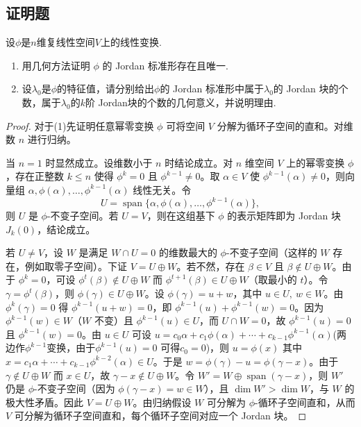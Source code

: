 \documentclass[lang=cn,12pt]{elegantbook}
\begin{document}
\subsection{证明题}
\begin{example}
    设$\phi$是$n$维复线性空间$V$上的线性变换.
    \begin{enumerate}
        \item[(1)]用几何方法证明 \(\phi\) 的 Jordan 标准形存在且唯一.
        \item[(2)]设$\lambda_0$是$\phi$的特征值，请分别给出$\phi$的 Jordan 标准形中属于$\lambda_0$的 Jordan 块的个数，属于$\lambda_0$的$k$阶 Jordan块的个数的几何意义，并说明理由.
    \end{enumerate}
\end{example}

\begin{proof}
        对于(1)先证明任意幂零变换 \(\phi\) 可将空间 \(V\) 分解为循环子空间的直和。对维数 \(n\) 进行归纳。
        
        当 \(n=1\) 时显然成立。设维数小于 \(n\) 时结论成立。对 \(n\) 维空间 \(V\) 上的幂零变换 \(\phi\)，存在正整数 \(k\le n\) 使得 \(\phi^k=0\) 且 \(\phi^{k-1}\neq0\)。取 \(\alpha\in V\) 使 \(\phi^{k-1}(\alpha)\neq0\)，则向量组 \(\alpha,\phi(\alpha),\dots,\phi^{k-1}(\alpha)\) 线性无关。令
        \[
        U = \operatorname{span}\{\alpha,\phi(\alpha),\dots,\phi^{k-1}(\alpha)\},
        \]
        则 \(U\) 是 \(\phi\)-不变子空间。若 \(U=V\)，则在这组基下 \(\phi\) 的表示矩阵即为 Jordan 块 \(J_k(0)\)，结论成立。
        
        若 \(U\neq V\)，设 \(W\) 是满足 \(W\cap U=0\) 的维数最大的 \(\phi\)-不变子空间（这样的 \(W\) 存在，例如取零子空间）。下证 \(V=U\oplus W\)。若不然，存在 \(\beta\in V\) 且 \(\beta\notin U\oplus W\)。由于 \(\phi^k=0\)，可设 \(\phi^t(\beta)\notin U\oplus W\) 而 \(\phi^{t+1}(\beta)\in U\oplus W\)（取最小的 \(t\)）。令 \(\gamma = \phi^t(\beta)\)，则 \(\phi(\gamma)\in U\oplus W\)。设 \(\phi(\gamma)=u+w\)，其中 \(u\in U,\ w\in W\)。由 \(\phi^k(\gamma)=0\) 得 \(\phi^{k-1}(u+w)=0\)，即 \(\phi^{k-1}(u)+\phi^{k-1}(w)=0\)。因为 \(\phi^{k-1}(w)\in W\)（\(W\) 不变）且 \(\phi^{k-1}(u)\in U\)，而 \(U\cap W=0\)，故 \(\phi^{k-1}(u)=0\) 且 \(\phi^{k-1}(w)=0\)。由 \(u\in U\) 可设 \(u = c_0 \alpha +  c_1\phi(\alpha)+\cdots+c_{k-1}\phi^{k-1}(\alpha)\)(两边作$\phi^{k-1}$变换，由于$\phi^{k-1}(u)= 0$ 可得$c_0 = 0$)，则 \(u=\phi(x)\) 其中 \(x=c_1\alpha+\cdots+c_{k-1}\phi^{k-2}(\alpha)\in U\)。于是 \(w = \phi(\gamma)-u = \phi(\gamma-x)\)。由于 \(\gamma\notin U\oplus W\) 而 \(x\in U\)，故 \(\gamma-x\notin U\oplus W\)。令 \(W' = W \oplus \operatorname{span}(\gamma-x)\)，则 \(W'\) 仍是 \(\phi\)-不变子空间（因为 \(\phi(\gamma-x)=w\in W\)），且 \(\dim W'>\dim W\)，与 \(W\) 的极大性矛盾。因此 \(V=U\oplus W\)。由归纳假设 \(W\) 可分解为 \(\phi\)-循环子空间直和，从而 \(V\) 可分解为循环子空间直和，每个循环子空间对应一个 Jordan 块。
        

\end{proof}
\end{document}
